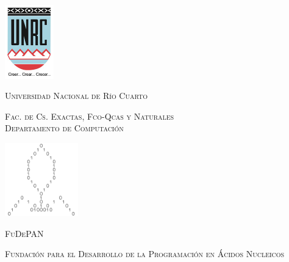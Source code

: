 \documentclass[a4paper,12pt]{report}
\begin{document}

    \begin{titlepage}
        \begin{center}

            \begin{minipage}{0.45\textwidth}
                \begin{center}
                    \includegraphics[width=60pt,height=90.5pt]{images/unrc.jpg}\\
                    \begin{scriptsize}
                        \textsc{Universidad Nacional de Río Cuarto} \\
                    \end{scriptsize}
                    \vfill
                    \begin{tiny}
                        \textsc{Fac. de Cs. Exactas, Fco-Qcas y Naturales} \\
                        \textsc{Departamento de Computación} \\[1cm]    
                    \end{tiny}
                \end{center}
            \end{minipage}
            \begin{minipage}{0.45\textwidth}
                \begin{center}
                    \includegraphics[width=90pt,height=90pt]{images/fudepan.png}\\
                    \vfill
                    \begin{scriptsize}
                        \textsc{FuDePAN} \\
                    \end{scriptsize}
                    \begin{tiny}
                        \textsc{Fundación para el Desarrollo de la Programación en Ácidos Nucleicos} \\[1cm]    
                    \end{tiny}
                \end{center}
            \end{minipage}


\end{center}
\end{titlepage}
\end{document}
